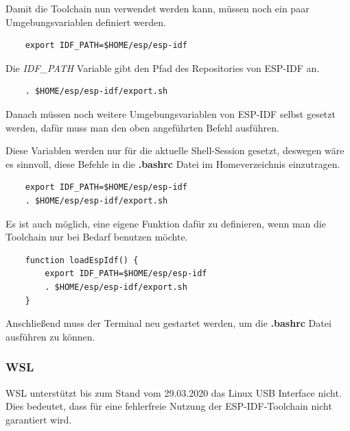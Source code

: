 Damit die Toolchain nun verwendet werden kann, müssen noch ein paar Umgebungsvariablen definiert werden. 

\vspace*{10px}
\begin{verbatim}
    export IDF_PATH=$HOME/esp/esp-idf
\end{verbatim}
\vspace*{10px}

Die \textit{IDF\_PATH} Variable gibt den Pfad des Repositories von ESP-IDF an.

\vspace*{10px}
\begin{verbatim}
    . $HOME/esp/esp-idf/export.sh
\end{verbatim}
\vspace*{10px}

Danach müssen noch weitere Umgebungsvariablen von ESP-IDF selbst gesetzt werden, dafür muss man den oben angeführten Befehl ausführen.

Diese Variablen werden nur für die aktuelle Shell-Session gesetzt, deswegen wäre es sinnvoll, diese Befehle in die \textbf{.bashrc} Datei im Homeverzeichnis einzutragen.

\vspace*{10px}
\begin{verbatim}
    export IDF_PATH=$HOME/esp/esp-idf
    . $HOME/esp/esp-idf/export.sh
\end{verbatim}
\vspace*{10px}

Es ist auch möglich, eine eigene Funktion dafür zu definieren, wenn man die Toolchain nur bei Bedarf benutzen möchte.

\vspace*{10px}
\begin{verbatim}
    function loadEspIdf() {
        export IDF_PATH=$HOME/esp/esp-idf
        . $HOME/esp/esp-idf/export.sh
    }
\end{verbatim}
\vspace*{10px}

Anschließend muss der Terminal neu gestartet werden, um die \textbf{.bashrc} Datei ausführen zu können.

\subsubsection{WSL}\label{sec:wsl}

WSL unterstützt bis zum Stand vom 29.03.2020 das Linux USB Interface nicht. Dies bedeutet, dass für eine fehlerfreie Nutzung der ESP-IDF-Toolchain nicht garantiert wird.

